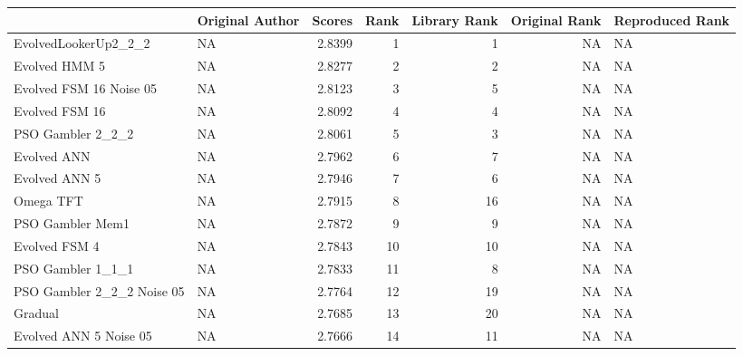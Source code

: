 \begin{tabular}{llrrrrl}
\toprule
{} &                     Original Author &  Scores &  Rank &  Library Rank &  Original Rank & Reproduced Rank \\
\midrule
EvolvedLookerUp2\_2\_2       &                                  NA &  2.8399 &     1 &             1 &             NA &              NA \\
Evolved HMM 5              &                                  NA &  2.8277 &     2 &             2 &             NA &              NA \\
Evolved FSM 16 Noise 05    &                                  NA &  2.8123 &     3 &             5 &             NA &              NA \\
Evolved FSM 16             &                                  NA &  2.8092 &     4 &             4 &             NA &              NA \\
PSO Gambler 2\_2\_2          &                                  NA &  2.8061 &     5 &             3 &             NA &              NA \\
Evolved ANN                &                                  NA &  2.7962 &     6 &             7 &             NA &              NA \\
Evolved ANN 5              &                                  NA &  2.7946 &     7 &             6 &             NA &              NA \\
Omega TFT                  &                                  NA &  2.7915 &     8 &            16 &             NA &              NA \\
PSO Gambler Mem1           &                                  NA &  2.7872 &     9 &             9 &             NA &              NA \\
Evolved FSM 4              &                                  NA &  2.7843 &    10 &            10 &             NA &              NA \\
PSO Gambler 1\_1\_1          &                                  NA &  2.7833 &    11 &             8 &             NA &              NA \\
PSO Gambler 2\_2\_2 Noise 05 &                                  NA &  2.7764 &    12 &            19 &             NA &              NA \\
Gradual                    &                                  NA &  2.7685 &    13 &            20 &             NA &              NA \\
Evolved ANN 5 Noise 05     &                                  NA &  2.7666 &    14 &            11 &             NA &              NA \\

\end{tabular}
